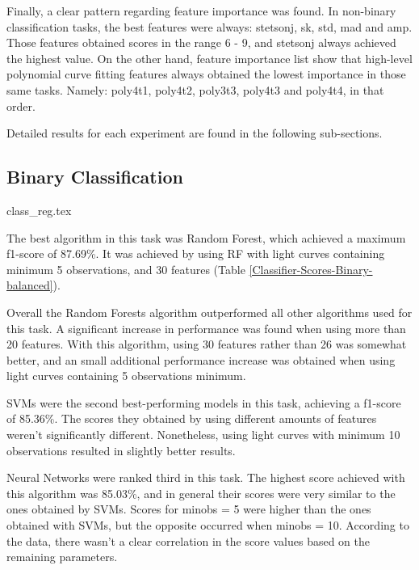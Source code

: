 \documentclass[a4paper,fleqn,usenatbib]{mnras}
\begin{document}

Finally, a clear pattern regarding feature importance was found. In non-binary classification tasks, the best features were always: stetson\textunderscore j, sk, std, mad and amp. Those features obtained scores in the range 6 - 9, and stetson\textunderscore j always achieved the highest value. On the other hand, feature importance list show that high-level polynomial curve fitting features always obtained the lowest importance in those same tasks. Namely: poly4\textunderscore t1, poly4\textunderscore t2, poly3\textunderscore t3, poly4\textunderscore t3 and poly4\textunderscore t4, in that order.

Detailed results for each experiment are found in the following sub-sections.


\subsection{Binary Classification} \label{Results-Binary}

{class_reg.tex}

The best algorithm in this task was Random Forest, which achieved a maximum f1-score of 87.69\%. It was achieved by using RF with light curves containing minimum 5 observations, and 30 features (Table \ref{Classifier-Scores-Binary-balanced}).

Overall the Random Forests algorithm outperformed all other algorithms used for this task. A significant increase in performance was found when using more than 20 features. With this algorithm, using 30 features rather than 26 was somewhat better, and an small additional performance increase was obtained when using light curves containing 5 observations minimum. 

SVMs were the second best-performing models in this task, achieving a f1-score of 85.36\%. The scores they obtained by using different amounts of features weren't significantly different. Nonetheless, using light curves with minimum 10 observations resulted in slightly better results.

Neural Networks were ranked third in this task. The highest score achieved with this algorithm was 85.03\%, and in general their scores were very similar to the ones obtained by SVMs. Scores for min\textunderscore obs = 5 were higher than the ones obtained with SVMs, but the opposite occurred when min\textunderscore obs = 10. According to the data, there wasn't a clear correlation in the score values based on the remaining parameters.
\end{document}
